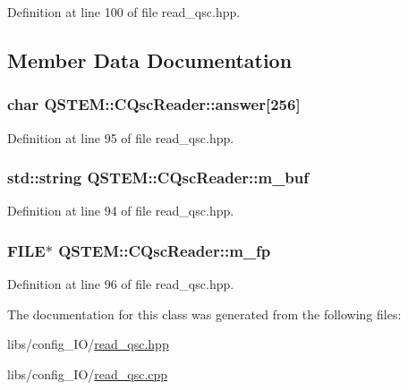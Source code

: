 Definition at line 100 of file read\-\_\-qsc.\-hpp.



\subsection{Member Data Documentation}
\hypertarget{class_q_s_t_e_m_1_1_c_qsc_reader_aa8612dec4b28cbb4f1d028dc62397292}{
\subsubsection[{answer}]{\setlength{\rightskip}{0pt plus 5cm}char Q\-S\-T\-E\-M\-::\-C\-Qsc\-Reader\-::answer\mbox{[}256\mbox{]}\hspace{0.3cm}{\ttfamily [protected]}}}\label{class_q_s_t_e_m_1_1_c_qsc_reader_aa8612dec4b28cbb4f1d028dc62397292}


Definition at line 95 of file read\-\_\-qsc.\-hpp.

\hypertarget{class_q_s_t_e_m_1_1_c_qsc_reader_aee58b38f0aadff3f09329f01a6ffc4e8}{
\subsubsection[{m\-\_\-buf}]{\setlength{\rightskip}{0pt plus 5cm}std\-::string Q\-S\-T\-E\-M\-::\-C\-Qsc\-Reader\-::m\-\_\-buf\hspace{0.3cm}{\ttfamily [protected]}}}\label{class_q_s_t_e_m_1_1_c_qsc_reader_aee58b38f0aadff3f09329f01a6ffc4e8}


Definition at line 94 of file read\-\_\-qsc.\-hpp.

\hypertarget{class_q_s_t_e_m_1_1_c_qsc_reader_ae723878e62e41b20aedda4f0c284cf48}{
\subsubsection[{m\-\_\-fp}]{\setlength{\rightskip}{0pt plus 5cm}F\-I\-L\-E$\ast$ Q\-S\-T\-E\-M\-::\-C\-Qsc\-Reader\-::m\-\_\-fp\hspace{0.3cm}{\ttfamily [protected]}}}\label{class_q_s_t_e_m_1_1_c_qsc_reader_ae723878e62e41b20aedda4f0c284cf48}


Definition at line 96 of file read\-\_\-qsc.\-hpp.



The documentation for this class was generated from the following files\-:\begin{DoxyCompactItemize}
\item 
libs/config\-\_\-\-I\-O/\hyperlink{read__qsc_8hpp}{read\-\_\-qsc.\-hpp}\item 
libs/config\-\_\-\-I\-O/\hyperlink{read__qsc_8cpp}{read\-\_\-qsc.\-cpp}\end{DoxyCompactItemize}
